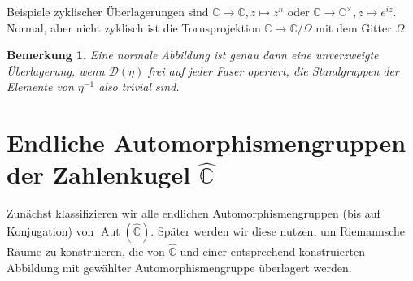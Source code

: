 \documentclass[12pt,a4paper]{article}
\theoremstyle{plain}
\newtheorem{Definition}[Theorem]{Definition}
\newtheorem{Bemerkung}[Theorem]{Bemerkung}
\newcommand{\herv}[1]{{\emph{\textbf{#1}}}}
\newcommand{\Z}{\mathbb{Z}}
\newcommand{\C}{\mathbb{C}}
\newcommand{\Ch}{\hat{\C}}
\numberwithin{equation}{section}
\begin{document}
Beispiele zyklischer Überlagerungen sind $\C\rightarrow \C, z\mapsto z^n$ oder $\C\rightarrow \C^\times, z\mapsto e^{i z}$. Normal, aber nicht zyklisch ist die Torusprojektion $\C\rightarrow \C/\Omega$ mit dem Gitter $\Omega$.
\begin{Bemerkung} Eine normale Abbildung ist genau dann eine unverzweigte Überlagerung, wenn $\mathcal{D}(\eta)$ frei auf jeder Faser operiert, die Standgruppen der Elemente von $\eta^{-1}$ also trivial sind.
\end{Bemerkung}

\section{Endliche Automorphismengruppen der Zahlenkugel $\hat{\C}$}
Zunächst klassifizieren wir alle endlichen Automorphismengruppen (bis auf Konjugation) von $\operatorname{Aut}(\hat{\C})$. Später werden wir diese nutzen, um Riemannsche Räume zu konstruieren, die von $\Ch$ und einer entsprechend konstruierten Abbildung mit gewählter Automorphismengruppe überlagert werden.
\end{document}
